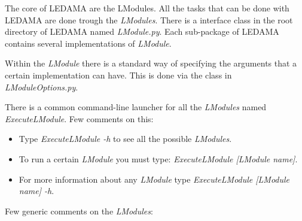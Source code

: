 \documentclass[a4paper,11pt]{article}
\begin{document}
The core of LEDAMA are the LModules. All the tasks that can be done with LEDAMA are done trough the \textit{LModules}. There is a interface class in the root directory of LEDAMA named \textit{LModule.py}.
Each sub-package of LEDAMA contains several implementations of \textit{LModule}.

Within the \textit{LModule} there is a standard way of specifying the arguments that a certain implementation can have. This is done via the class in \textit{LModuleOptions.py}.

There is a common command-line launcher for all the \textit{LModules} named \textit{ExecuteLModule}. Few comments on this:

\begin{itemize}
    \item Type \textit{ExecuteLModule -h} to see all the possible \textit{LModules}.
    \item To run a certain \textit{LModule} you must type: \textit{ExecuteLModule [LModule name]}.
    \item For more information about any \textit{LModule} type \textit{ExecuteLModule [LModule name] -h}.
\end{itemize}

Few generic comments on the \textit{LModules}:
\end{document}
